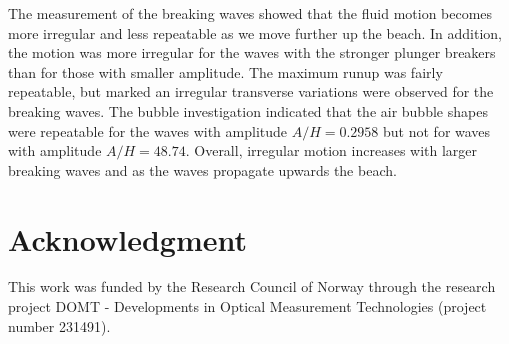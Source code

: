 \documentclass[review]{elsarticle}
\begin{document}
The measurement of the breaking waves showed that the fluid motion becomes more irregular and less repeatable as we move further up the beach. In addition, the motion was more irregular for the waves with the stronger plunger breakers than for those with smaller amplitude. The maximum runup was fairly repeatable, but marked an irregular
transverse  variations were observed for the breaking waves. The bubble investigation indicated
 that the air bubble shapes  were repeatable  for the waves with amplitude $A/H=0.2958$ but not for waves with amplitude  $A/H=48.74$. Overall, irregular motion increases with larger breaking waves and as the waves propagate upwards the beach.  

\section*{Acknowledgment}

This work was funded by the Research Council of Norway through the research project DOMT - Developments in Optical Measurement Technologies (project number 231491).
 

\end{document}
